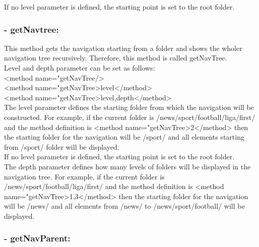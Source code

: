   If no level parameter is defined, the starting point is set to the 
root folder. \\

\subsubsection{- getNavtree:} 

  This method gets the navigation starting from a folder and shows 
the wholer navigation tree recursively. Therefore, this method is 
called {\name getNavTree}. \\

  Level and depth parameter can be set as follows: \\
  {\tag <method name="getNavTree/>} \\
  {\tag <method name="getNavTree>level</method>} \\
  {\tag <method name="getNavTree>level,depth</method>} \\

  The level parameter defines the starting folder from which the 
navigation will be constructed. For example, if the current folder is 
{\dir /news/sport/foot\-ball/li\-ga/first/} and the method definition is 
{\tag <method name="getNavTree>2</method>} then the starting folder for the 
navigation will be {\dir /sport/} and all elements starting from 
{\dir /sport/} folder will be displayed. \\

  If no level parameter is defined, the starting point is set to the 
root folder. \\

  The depth parameter defines how many levels of folders will be displayed 
in the navigation tree. For example, if the current folder is 
{\dir /news/sport/football/liga/first/} and the method definition is 
{\tag <method name="getNavTree>1,3</method>} then the starting folder for 
the navigation will be {\dir /news/} and all elements from {\dir /news/} 
to {\dir /news/sport/football/} will be displayed. \\

\subsubsection{- getNavParent:} 

